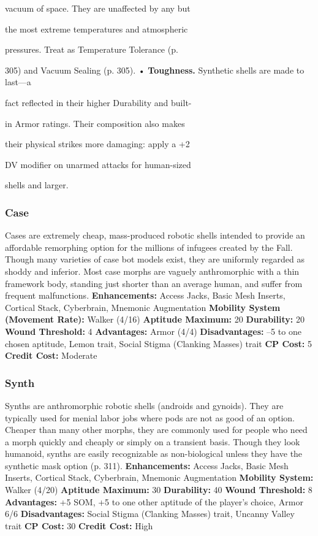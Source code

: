 vacuum of space. They are unaffected by any but 

the most extreme temperatures and atmospheric 

pressures. Treat as Temperature Tolerance (p. 

305) and Vacuum Sealing (p. 305).
•  \textbf{Toughness.} Synthetic shells are made to last—a 

fact reflected in their higher Durability and built-

in Armor ratings. Their composition also makes 

their physical strikes more damaging: apply a +2 

DV modifier on unarmed attacks for human-sized 

shells and larger.

\subsubsection{Case}

Cases are extremely cheap, mass-produced robotic 
shells intended to provide an affordable remorphing
option for the millions of infugees created by
the Fall. Though many varieties of case bot models 
exist, they are uniformly regarded as shoddy and 
inferior. Most case morphs are vaguely anthromorphic
with a thin framework body, standing just
shorter than an average human, and suffer from 
frequent malfunctions.
\textbf{Enhancements: }Access Jacks, Basic Mesh Inserts, Cortical
Stack, Cyberbrain, Mnemonic Augmentation
\textbf{Mobility System (Movement Rate):} Walker (4/16)
\textbf{Aptitude Maximum: }20
\textbf{Durability:} 20
\textbf{Wound Threshold:} 4
\textbf{Advantages:} Armor (4/4)
\textbf{Disadvantages: }–5 to one chosen aptitude, Lemon trait, 
Social Stigma (Clanking Masses) trait
\textbf{CP Cost:} 5
\textbf{Credit Cost: }Moderate

\subsubsection{Synth}

Synths are anthromorphic robotic shells (androids 
and gynoids). They are typically used for menial 
labor jobs where pods are not as good of an option. 
Cheaper than many other morphs, they are commonly
used for people who need a morph quickly
and cheaply or simply on a transient basis. Though 
they look humanoid, synths are easily recognizable 
as non-biological unless they have the synthetic mask 
option (p. 311).
\textbf{Enhancements:} Access Jacks, Basic Mesh Inserts, Cortical
Stack, Cyberbrain, Mnemonic Augmentation
\textbf{Mobility System:} Walker (4/20)
\textbf{Aptitude Maximum: }30
\textbf{Durability:} 40
\textbf{Wound Threshold:} 8
\textbf{Advantages: }+5 SOM, +5 to one other aptitude of the 
player's choice, Armor 6/6
\textbf{Disadvantages: }Social Stigma (Clanking Masses) trait, 
Uncanny Valley trait
\textbf{CP Cost:} 30
\textbf{Credit Cost: }High

